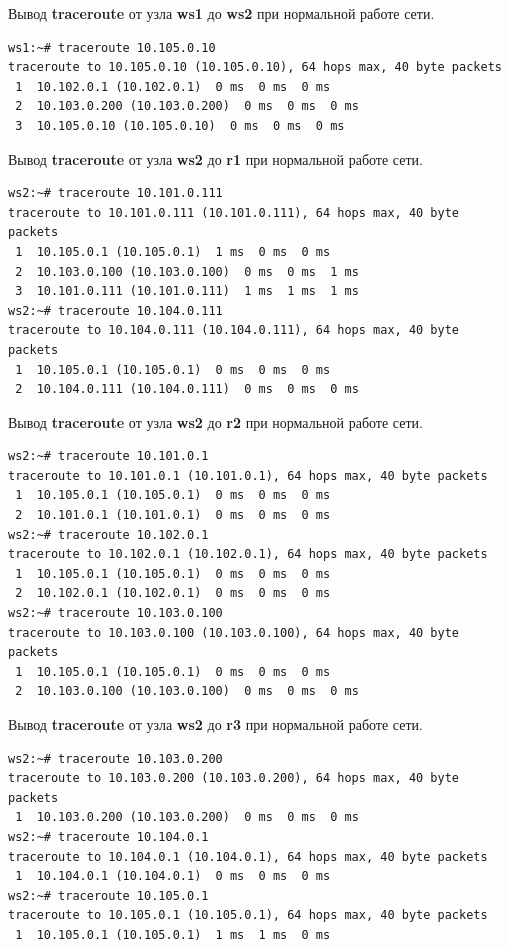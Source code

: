 \documentclass[a4paper,12pt]{article}
\begin{document}
Вывод \textbf{traceroute} от узла \textbf{ws1} до \textbf{ws2} при нормальной работе сети.

\begin{Verbatim}
ws1:~# traceroute 10.105.0.10
traceroute to 10.105.0.10 (10.105.0.10), 64 hops max, 40 byte packets
 1  10.102.0.1 (10.102.0.1)  0 ms  0 ms  0 ms
 2  10.103.0.200 (10.103.0.200)  0 ms  0 ms  0 ms
 3  10.105.0.10 (10.105.0.10)  0 ms  0 ms  0 ms
\end{Verbatim}

Вывод \textbf{traceroute} от узла \textbf{ws2} до \textbf{r1} при нормальной работе сети.

\begin{Verbatim}
ws2:~# traceroute 10.101.0.111
traceroute to 10.101.0.111 (10.101.0.111), 64 hops max, 40 byte packets
 1  10.105.0.1 (10.105.0.1)  1 ms  0 ms  0 ms
 2  10.103.0.100 (10.103.0.100)  0 ms  0 ms  1 ms
 3  10.101.0.111 (10.101.0.111)  1 ms  1 ms  1 ms
ws2:~# traceroute 10.104.0.111
traceroute to 10.104.0.111 (10.104.0.111), 64 hops max, 40 byte packets
 1  10.105.0.1 (10.105.0.1)  0 ms  0 ms  0 ms
 2  10.104.0.111 (10.104.0.111)  0 ms  0 ms  0 ms
\end{Verbatim}

Вывод \textbf{traceroute} от узла \textbf{ws2} до \textbf{r2} при нормальной работе сети.

\begin{Verbatim}
ws2:~# traceroute 10.101.0.1
traceroute to 10.101.0.1 (10.101.0.1), 64 hops max, 40 byte packets
 1  10.105.0.1 (10.105.0.1)  0 ms  0 ms  0 ms
 2  10.101.0.1 (10.101.0.1)  0 ms  0 ms  0 ms
ws2:~# traceroute 10.102.0.1
traceroute to 10.102.0.1 (10.102.0.1), 64 hops max, 40 byte packets
 1  10.105.0.1 (10.105.0.1)  0 ms  0 ms  0 ms
 2  10.102.0.1 (10.102.0.1)  0 ms  0 ms  0 ms
ws2:~# traceroute 10.103.0.100
traceroute to 10.103.0.100 (10.103.0.100), 64 hops max, 40 byte packets
 1  10.105.0.1 (10.105.0.1)  0 ms  0 ms  0 ms
 2  10.103.0.100 (10.103.0.100)  0 ms  0 ms  0 ms
\end{Verbatim}

Вывод \textbf{traceroute} от узла \textbf{ws2} до \textbf{r3} при нормальной работе сети.

\begin{Verbatim}
ws2:~# traceroute 10.103.0.200
traceroute to 10.103.0.200 (10.103.0.200), 64 hops max, 40 byte packets
 1  10.103.0.200 (10.103.0.200)  0 ms  0 ms  0 ms
ws2:~# traceroute 10.104.0.1
traceroute to 10.104.0.1 (10.104.0.1), 64 hops max, 40 byte packets
 1  10.104.0.1 (10.104.0.1)  0 ms  0 ms  0 ms
ws2:~# traceroute 10.105.0.1
traceroute to 10.105.0.1 (10.105.0.1), 64 hops max, 40 byte packets
 1  10.105.0.1 (10.105.0.1)  1 ms  1 ms  0 ms
\end{Verbatim}
\end{document}

